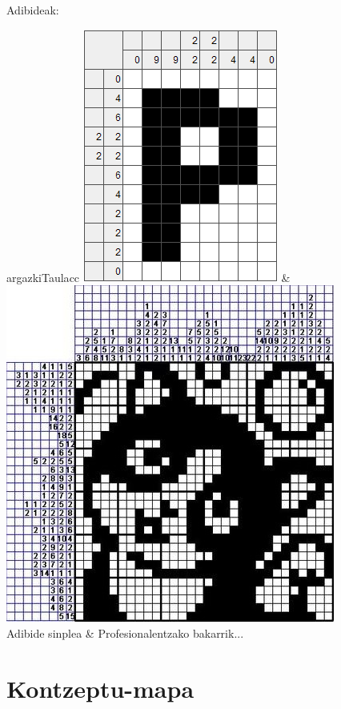 \documentclass[dvipsnames]{../../../../AritzhClass}
\begin{document}
Adibideak:

\begin{taula}{}{argazkiTaula}{cc}
\includegraphics[scale=0.75]{nonograma1} & \includegraphics[scale=0.75]{nonograma2} \\
Adibide sinplea & Profesionalentzako bakarrik...
\end{taula}

\section{Kontzeptu-mapa}
\end{document}
